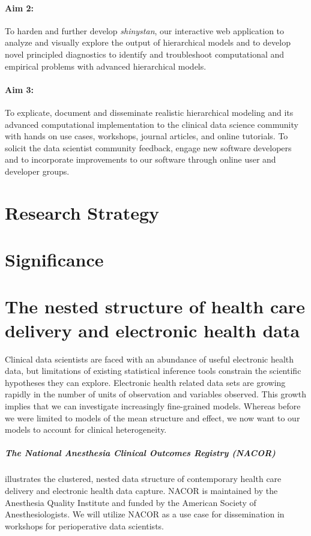 \documentclass[11pt,notitlepage]{article}
\begin{document}
\paragraph*{Aim 2:} To harden and further develop \textit{shinystan}, our 
interactive web application to analyze and visually explore the output of hierarchical 
models and to develop novel principled diagnostics to identify and troubleshoot
computational and empirical problems with advanced hierarchical models.

\paragraph*{Aim 3:} To explicate, document and disseminate realistic hierarchical 
modeling and its advanced computational implementation to the 
clinical data science community with hands on use cases, workshops, journal articles, and 
online tutorials. To solicit the data scientist community feedback, engage new 
software developers and to incorporate improvements to our software through 
online user and developer groups.

\section*{Research Strategy}

\section*{Significance}

\section*{The nested structure of health care delivery and electronic health data}
Clinical data scientists are faced with an abundance of useful electronic health data, 
but limitations of existing statistical inference tools constrain the scientific 
hypotheses they can explore. Electronic health related data sets 
are growing rapidly in the number of units of observation and 
variables observed. This growth implies that we can investigate increasingly fine-grained 
models. Whereas before we were limited to models of the mean structure and effect, we 
now want to our models to account for clinical heterogeneity.

\subparagraph*{The National Anesthesia Clinical Outcomes Registry (NACOR)} illustrates 
the clustered, nested data structure of contemporary health  care delivery and electronic health data capture. 
NACOR is maintained by the Anesthesia Quality Institute and funded by the American Society of 
Anesthesiologists. We will utilize NACOR as a use case for dissemination in workshops for perioperative data scientists.
\end{document}
